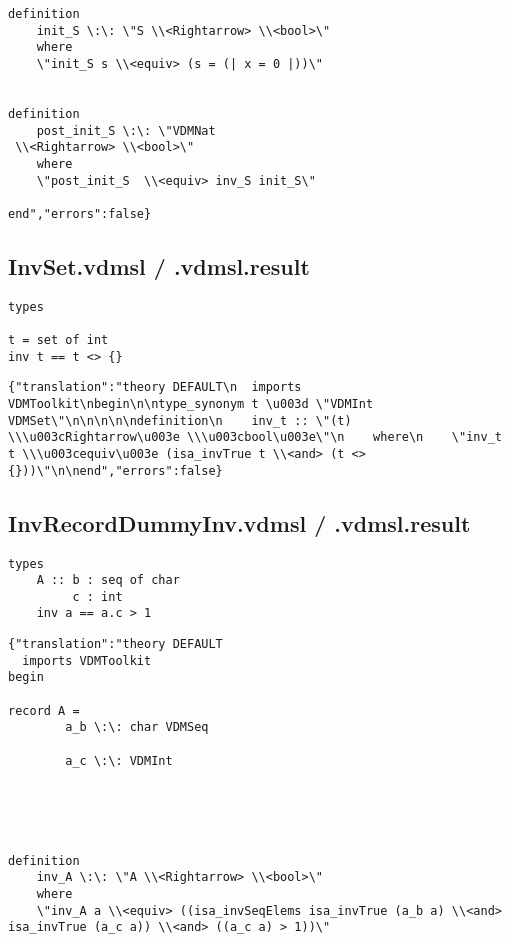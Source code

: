 \begin{appendices}
\begin{lstlisting}
definition
    init_S \:\: \"S \\<Rightarrow> \\<bool>\"
    where
    \"init_S s \\<equiv> (s = (| x = 0 |))\"


definition
    post_init_S \:\: \"VDMNat
 \\<Rightarrow> \\<bool>\"
    where
    \"post_init_S  \\<equiv> inv_S init_S\"

end","errors":false}
\end{lstlisting}

\subsection{InvSet.vdmsl / .vdmsl.result}
\begin{lstlisting}
types

t = set of int
inv t == t <> {}
\end{lstlisting}

\begin{lstlisting}
{"translation":"theory DEFAULT\n  imports VDMToolkit\nbegin\n\ntype_synonym t \u003d \"VDMInt VDMSet\"\n\n\n\n\ndefinition\n    inv_t :: \"(t) \\\u003cRightarrow\u003e \\\u003cbool\u003e\"\n    where\n    \"inv_t t \\\u003cequiv\u003e (isa_invTrue t \\<and> (t <> {}))\"\n\nend","errors":false}
\end{lstlisting}

\subsection{InvRecordDummyInv.vdmsl / .vdmsl.result}
\begin{lstlisting}
types
    A :: b : seq of char
         c : int
    inv a == a.c > 1
\end{lstlisting}

\begin{lstlisting}
{"translation":"theory DEFAULT
  imports VDMToolkit
begin

record A =
        a_b \:\: char VDMSeq

        a_c \:\: VDMInt

    



definition
    inv_A \:\: \"A \\<Rightarrow> \\<bool>\"
    where
    \"inv_A a \\<equiv> ((isa_invSeqElems isa_invTrue (a_b a) \\<and> isa_invTrue (a_c a)) \\<and> ((a_c a) > 1))\"


\end{lstlisting}
\end{appendices}
